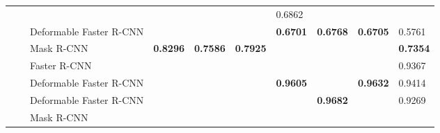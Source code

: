 \documentclass{ieeeaccess}
\begin{document}
\begin{table*}
\begin{tabularx}{\linewidth}{|u|u|t|v|v|k|v|v|k|k|}
        \footnotesize {}&
        \footnotesize {}&
        \footnotesize {}&
        \footnotesize {}&
        \footnotesize {}&
        \footnotesize {}&
        \footnotesize {0.6862} \\
         & &\footnotesize  Deformable Faster R-CNN&
        \footnotesize {}&
        \footnotesize {}&
        \footnotesize {}&
        \footnotesize \centering \textbf{0.6701}&
        \footnotesize \centering \textbf{0.6768}&
        \footnotesize \centering \textbf{0.6705}&
        \footnotesize {0.5761} \\
        & &\footnotesize  Mask R-CNN&
        \footnotesize \centering \textbf{0.8296}&
        \footnotesize \centering \textbf{0.7586}&
        \footnotesize \centering \textbf{0.7925}&
        \footnotesize {}&
        \footnotesize {}&
        \footnotesize {}&
        \footnotesize 
        \textbf{0.7354} \\
        
        & \footnotesize {}&
        \footnotesize  Faster R-CNN&
        \footnotesize {}&
        \footnotesize {}&
        \footnotesize {}&
        \footnotesize {}&
        \footnotesize {}&
        \footnotesize {}&
        \footnotesize 
        {0.9367} \\
        & &\footnotesize  Deformable Faster R-CNN &
        
        \footnotesize {}&
        \footnotesize {}&
        \footnotesize {}&
        \footnotesize \centering \textbf{0.9605}&
        \footnotesize {}&
        \footnotesize \centering \textbf{0.9632}&
        \footnotesize {0.9414} \\
         & &\footnotesize  Deformable Faster R-CNN&
        \footnotesize {}&
        \footnotesize {}&
        \footnotesize {}&
        \footnotesize {}&
        \footnotesize \centering \textbf{0.9682}&
        \footnotesize {}&
        \footnotesize {0.9269} \\
        & &\footnotesize  Mask R-CNN&
        

\end{tabularx}
\end{table*}
\end{document}
